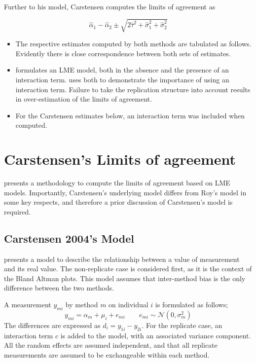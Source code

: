 \documentclass{report}
\begin{document}
Further to his model, Carstensen computes the limits of agreement
as

\[
\hat{\alpha}_1 - \hat{\alpha}_2 \pm \sqrt{2 \hat{\tau}^2 +
	\hat{\sigma}^2_1 + \hat{\sigma}^2_2}
\]

%
\large
\begin{itemize}
	\item The respective estimates computed by both methods are tabulated as follows. Evidently there is close correspondence between both sets of estimates.
	
	\item \citet{BXC2008} formulates an LME model, both in the absence and the presence of an interaction term.\citet{BXC2008} uses both to demonstrate the importance of using an interaction term. Failure to take the replication structure into
	account results in over-estimation of the limits of agreement. 
	\item For the Carstensen estimates below, an interaction term was included when computed.
\end{itemize}
\newpage

\section{Carstensen's Limits of agreement}
\citet{BXC2008} presents a methodology to compute the limits of
agreement based on LME models. Importantly, Carstensen's underlying model differs from Roy's model in some key respects, and therefore a prior discussion of Carstensen's model is required.

\subsection{Carstensen 2004's Model}

\citet{BXC2004} presents a model to describe the relationship between a value of measurement and its
real value. The non-replicate case is considered first, as it is the context of the Bland Altman plots. This model assumes that inter-method bias is the only difference between the two methods.

A measurement $y_{mi}$ by method $m$ on individual $i$ is formulated as follows;
\begin{equation}
	y_{mi}  = \alpha_{m} + \mu_{i} + e_{mi} \qquad  e_{mi} \sim
	\mathcal{N}(0,\sigma^{2}_{m})
\end{equation}
The differences are expressed as $d_{i} = y_{1i} - y_{2i}$. For the replicate case, an interaction term $c$ is added to the model, with an associated variance component. All the random effects are assumed independent, and that all replicate measurements are assumed to be exchangeable within each method.
\end{document}
